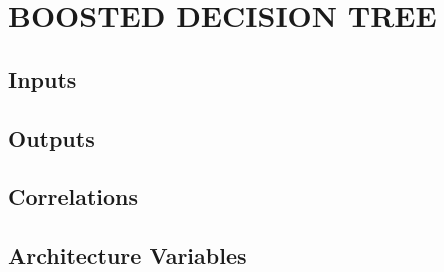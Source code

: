 %
%
%
%


\chapter{\uppercase{Boosted Decision Tree}}

\section{Inputs}
\section{Outputs}
\section{Correlations}
\section{Architecture Variables}

